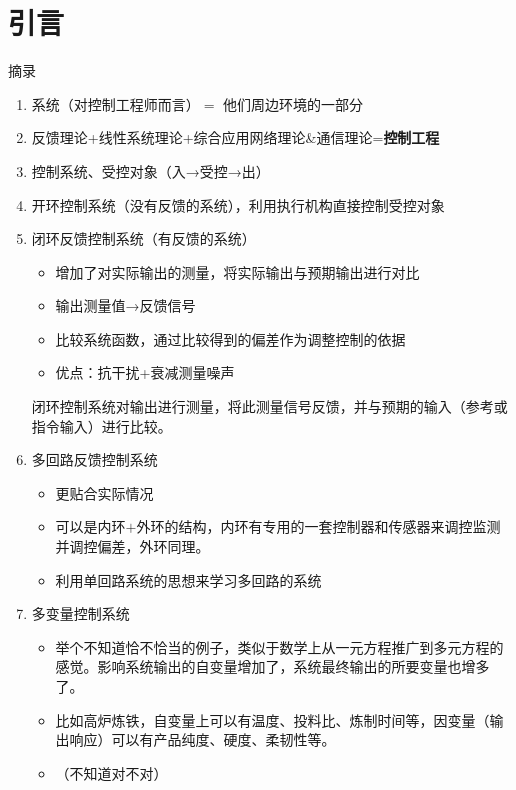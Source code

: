 \documentclass[oneside,a4paper]{ctexbook}
\begin{document}
\section{引言}
摘录
\begin{enumerate}
    \item 系统（对控制工程师而言）$=$ 他们周边环境的一部分
    \item 反馈理论+线性系统理论+综合应用网络理论\&通信理论=\textbf{控制工程}
    \item 控制系统、受控对象（入→受控→出）
    \item 开环控制系统（没有反馈的系统），利用执行机构直接控制受控对象
    \item 闭环反馈控制系统（有反馈的系统）
    \begin{itemize}
        \item 增加了对实际输出的测量，将实际输出与预期输出进行对比
        \item 输出测量值→反馈信号
        \item 比较系统函数，通过比较得到的偏差作为调整控制的依据
        \item 优点：抗干扰+衰减测量噪声    
    \end{itemize}
    \begin{tcolorbox}[reset]
        闭环控制系统对输出进行测量，将此测量信号反馈，并与预期的输入（参考或指令输入）进行比较。
    \end{tcolorbox}
    \item 多回路反馈控制系统
    \begin{itemize}
        \item 更贴合实际情况
        \item 可以是内环$+$外环的结构，内环有专用的一套控制器和传感器来调控监测并调控偏差，外环同理。
        \item 利用单回路系统的思想来学习多回路的系统
    \end{itemize}
    \item 多变量控制系统
    \begin{itemize}
        \item 举个不知道恰不恰当的例子，类似于数学上从一元方程推广到多元方程的感觉。影响系统输出的自变量增加了，系统最终输出的所要变量也增多了。
        \item 比如高炉炼铁，自变量上可以有温度、投料比、炼制时间等，因变量（输出响应）可以有产品纯度、硬度、柔韧性等。
        \item （不知道对不对）
    \end{itemize}
\end{enumerate}
\end{document}
